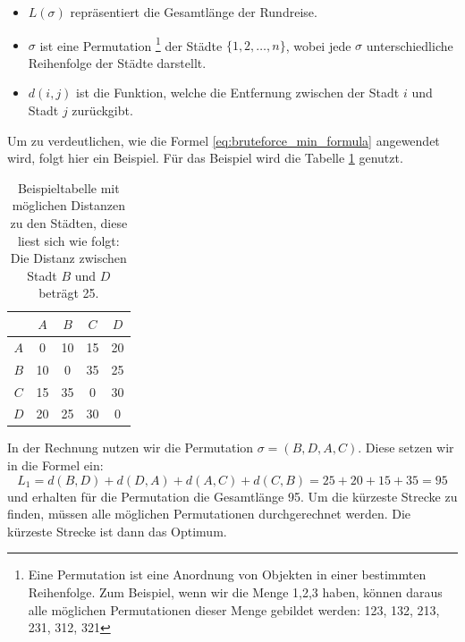 \begin{itemize}
    \item \( L(\sigma) \) repräsentiert die Gesamtlänge der Rundreise.
    \item \( \sigma \) ist eine Permutation
          \footnote{
              Eine Permutation ist eine Anordnung von Objekten in einer bestimmten Reihenfolge.
              Zum Beispiel, wenn wir die Menge {1,2,3} haben, können daraus alle möglichen 
              Permutationen dieser Menge gebildet werden: 123, 132, 213, 231, 312, 321 
          }
          der Städte \( \{1, 2, \ldots, n\} \),
          wobei jede \( \sigma \) unterschiedliche Reihenfolge der Städte darstellt.
    \item \( d(i, j) \) ist die Funktion, welche die Entfernung zwischen der Stadt \( i \) und
          Stadt \( j \) zurückgibt.
\end{itemize}
\begin{beispiel}
    \label{buch:paper:varalg:subsection:bruteforce_calculate}
    Um zu verdeutlichen, wie die Formel \eqref{eq:bruteforce_min_formula}
    angewendet wird, folgt hier ein Beispiel. Für das Beispiel wird die Tabelle 
    \ref{tab:example_bruteforce_cities} genutzt.
    \begin{table}
        \centering
        \begin{tabular}{|c|c|c|c|c|}
            \hline
                & $A$ & $B$ & $C$ & $D$ \\ \hline
            $A$ & 0   & 10  & 15  & 20  \\ \hline
            $B$ & 10  & 0   & 35  & 25  \\ \hline
            $C$ & 15  & 35  & 0   & 30  \\ \hline
            $D$ & 20  & 25  & 30  & 0   \\ \hline
        \end{tabular}
        \caption{
            Beispieltabelle mit möglichen Distanzen zu den Städten, diese liest sich wie folgt:
            Die Distanz zwischen Stadt $B$ und $D$ beträgt 25.
        }
        \label{tab:example_bruteforce_cities}
    \end{table}
    In der Rechnung nutzen wir die Permutation $\sigma = (B, D, A, C)$.
    Diese setzen wir in die Formel ein:
    \begin{equation}
        L_1 = d(B, D) + d(D, A) + d(A, C) + d(C, B)
        =
        25 + 20 + 15 + 35 = 95
        \label{eq:bruteforce_min_formula_example}
    \end{equation}
    und erhalten für die Permutation die Gesamtlänge 95. Um die kürzeste Strecke zu finden,
    müssen alle möglichen Permutationen durchgerechnet werden. Die kürzeste Strecke ist dann
    das Optimum. 
\end{beispiel}
